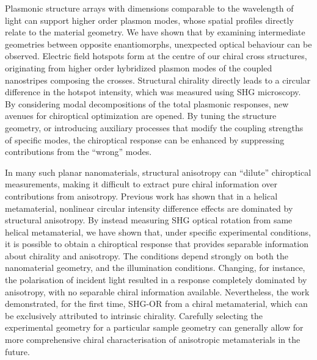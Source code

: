 Plasmonic structure arrays with dimensions comparable to the wavelength of light can support higher order plasmon modes, whose spatial profiles directly relate to the material geometry. We have shown that by examining intermediate geometries between opposite enantiomorphs, unexpected optical behaviour can be observed. Electric field hotspots form at the centre of our chiral cross structures, originating from higher order hybridized plasmon modes of the coupled nanostripes composing the crosses. Structural chirality directly leads to a circular difference in the hotspot intensity, which was measured using SHG microscopy. By considering modal decompositions of the total plasmonic responses, new avenues for chiroptical optimization are opened. By tuning the structure geometry, or introducing auxiliary processes that modify the coupling strengths of specific modes, the chiroptical response can be enhanced by suppressing contributions from the ``wrong'' modes.

In many such planar nanomaterials, structural anisotropy can ``dilute'' chiroptical measurements, making it difficult to extract pure chiral information over contributions from anisotropy. Previous work has shown that in a helical metamaterial, nonlinear circular intensity difference effects are dominated by structural anisotropy. By instead measuring SHG optical rotation from same helical metamaterial, we have shown that, under specific experimental conditions, it is possible to obtain a chiroptical response that provides separable information about chirality and anisotropy. The conditions depend strongly on both the nanomaterial geometry, and the illumination conditions. Changing, for instance, the polarisation of incident light resulted in a response completely dominated by anisotropy, with no separable chiral information available. Nevertheless, the work demonstrated, for the first time, SHG-OR from a chiral metamaterial, which can be exclusively attributed to intrinsic chirality. Carefully selecting the experimental geometry for a particular sample geometry can generally allow for more comprehensive chiral characterisation of anisotropic metamaterials in the future.

